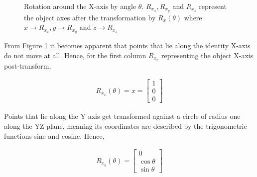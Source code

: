\documentclass[12pt, a4paper]{article}
\begin{document}
\begin{figure}[H]
    \centering
    \caption{Rotation around the X-axis by angle $\theta$. $R_{x_x}, R_{x_y}$
        and $R_{x_z}$ represent the object axes after the transformation by
        $R_x(\theta)$ where $x \to R_{x_x}, y \to R_{x_y}$ and $z \to R_{x_z}$}
    \label{rot_x}
\end{figure}

From Figure \ref{rot_x} it becomes apparent that points that lie along the identity X-axis do
not move at all. Hence, for the first column $R_{x_x}$ representing the object
X-axis post-transform,

\begin{align*}
    R_{x_x}(\theta) = x = \begin{bmatrix} 1 \\
                              0 \\ 0\end{bmatrix}
\end{align*}

Points that lie along the Y axis get transformed against a circle of radius one
along the YZ plane, meaning  its coordinates are described by the trigonometric
functions sine and cosine. Hence,

\begin{align*}
    R_{x_y}(\theta) = \begin{bmatrix} 0 \\ \cos\theta \\ \sin\theta
                      \end{bmatrix}
\end{align*}
\end{document}
